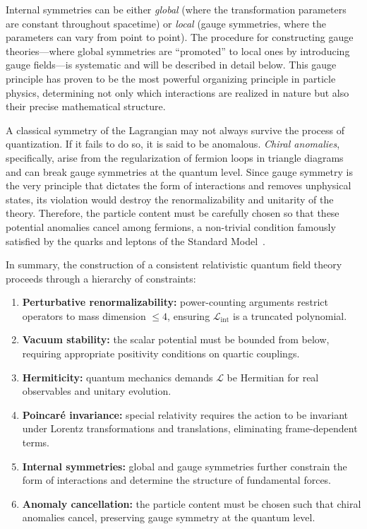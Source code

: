Internal symmetries can be either \textit{global} (where the transformation parameters are constant throughout spacetime) or \textit{local} (gauge symmetries, where the parameters can vary from point to point). The procedure for constructing gauge theories—where global symmetries are ``promoted'' to local ones by introducing gauge fields—is systematic and will be described in detail below. This gauge principle has proven to be the most powerful organizing principle in particle physics, determining not only which interactions are realized in nature but also their precise mathematical structure.

A classical symmetry of the Lagrangian may not always survive the process of quantization. If it fails to do so, it is said to be anomalous. \textit{Chiral anomalies}, specifically, arise from the regularization of fermion loops in triangle diagrams and can break gauge symmetries at the quantum level. Since gauge symmetry is the very principle that dictates the form of interactions and removes unphysical states, its violation would destroy the renormalizability and unitarity of the theory. Therefore, the particle content must be carefully chosen so that these potential anomalies cancel among fermions, a non-trivial condition famously satisfied by the quarks and leptons of the Standard Model~\parencite{peskin,Weinberg,bertlmann1996anomalies}.

In summary, the construction of a consistent relativistic quantum field theory proceeds through a hierarchy of constraints:
\begin{enumerate}
	\item \textbf{Perturbative renormalizability:} power-counting arguments restrict operators to mass dimension $\leq 4$, ensuring $\mathcal{L}_{\text{int}}$ is a truncated polynomial.
	\item \textbf{Vacuum stability:} the scalar potential must be bounded from below, requiring appropriate positivity conditions on quartic couplings.
	\item \textbf{Hermiticity:} quantum mechanics demands $\mathcal{L}$ be Hermitian for real observables and unitary evolution.
	\item \textbf{Poincaré invariance:} special relativity requires the action to be invariant under Lorentz transformations and translations, eliminating frame-dependent terms.
	\item \textbf{Internal symmetries:} global and gauge symmetries further constrain the form of interactions and determine the structure of fundamental forces.
	\item \textbf{Anomaly cancellation:} the particle content must be chosen such that chiral anomalies cancel, preserving gauge symmetry at the quantum level.
\end{enumerate}

